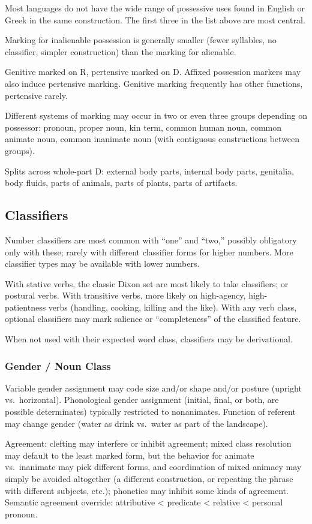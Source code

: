 \documentclass[11pt]{article}
\begin{document}
\noindent Most languages do not have the wide range of possessive uses
found in English or Greek in the same construction.  The first three
in the list above are most central.

Marking for inalienable possession is generally smaller (fewer
syllables, no classifier, simpler construction) than the marking for
alienable.

Genitive marked on R, pertensive marked on D.  Affixed possession
markers may also induce pertensive marking.  Genitive marking
frequently has other functions, pertensive rarely.

Different systems of marking may occur in two or even three groups
depending on possessor: pronoun, proper noun, kin term, common human
noun, common animate noun, common inanimate noun (with contiguous
constructions between groups).

Splits across whole-part D: external body parts, internal body parts,
genitalia, body fluids, parts of animals, parts of plants, parts of
artifacts. 

\subsection{Classifiers}
Number classifiers are most common with ``one'' and ``two,'' possibly
obligatory only with these; rarely with different classifier forms for
higher numbers.  More classifier types may be available with lower
numbers.

With stative verbs, the classic Dixon set are most likely to take
classifiers; or postural verbs.  With transitive verbs, more likely on
high-agency, high-patientness verbs (handling, cooking, killing and
the like).  With any verb class, optional classifiers may mark
salience or ``completeness'' of the classified feature.

When not used with their expected word class, classifiers may be
derivational.

\subsubsection{Gender / Noun Class}
Variable gender assignment may code size and/or shape and/or posture
(upright vs.\ horizontal).  Phonological gender assignment (initial,
final, or both, are possible determinates) typically restricted to
nonanimates.  Function of referent may change gender (water as drink
vs.\ water as part of the landscape).

Agreement: clefting may interfere or inhibit agreement; mixed class
resolution may default to the least marked form, but the behavior for
animate vs.\ inanimate may pick different forms, and coordination of
mixed animacy may simply be avoided altogether (a different
construction, or repeating the phrase with different subjects, etc.);
phonetics may inhibit some kinds of agreement.  Semantic agreement
override: attributive < predicate < relative < personal pronoun.
\end{document}

